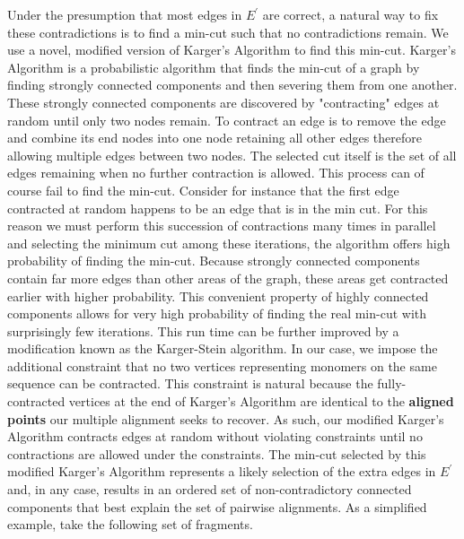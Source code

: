 \documentclass[11pt]{article}
\begin{document}
\par{
Under the presumption that most edges in $E^\prime$ are correct, a natural way to fix these contradictions is to find a min-cut such that no contradictions remain.  We use a novel, modified version of Karger's Algorithm to find this min-cut.  Karger's Algorithm is a probabilistic algorithm that finds the min-cut of a graph by finding strongly connected components and then severing them from one another.  These strongly connected components are discovered by "contracting" edges at random until only two nodes remain.  To contract an edge is to remove the edge and combine its end nodes into one node retaining all other edges therefore allowing multiple edges between two nodes.  The selected cut itself is the set of all edges remaining when no further contraction is allowed.  This process can of course fail to find the min-cut.  Consider for instance that the first edge contracted at random happens to be an edge that is in the min cut.  For this reason we must perform this succession of contractions many times in parallel and selecting the minimum cut among these iterations, the algorithm offers high probability of finding the min-cut.  Because strongly connected components contain far more edges than other areas of the graph, these areas get contracted earlier with higher probability.  This convenient property of highly connected components allows for very high probability of finding the real min-cut with surprisingly few iterations.  This run time can be further improved by a modification known as the Karger-Stein algorithm.  In our case, we impose the additional constraint that no two vertices representing monomers on the same sequence can be contracted.  This constraint is natural because the fully-contracted vertices at the end of Karger's Algorithm are identical to the \textbf{aligned points} our multiple alignment seeks to recover.  As such, our modified Karger's Algorithm contracts edges at random without violating constraints until no contractions are allowed under the constraints.  The min-cut selected by this modified Karger's Algorithm represents a likely selection of the extra edges in $E^\prime$ and, in any case, results in an ordered set of non-contradictory connected components that best explain the set of pairwise alignments.\cite{Karger1}\cite{Karger2}
 As a simplified example, take the following set of fragments.}
\end{document}
